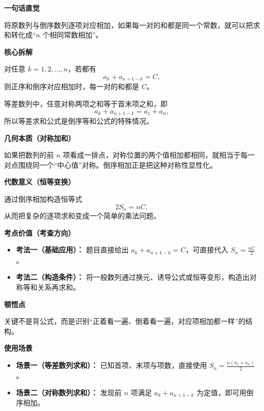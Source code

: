 \begin{explanationbox}
	\textbf{\textcolor{CExplanation}{一句话直觉}}

	将原数列与倒序数列逐项对应相加，如果每一对的和都是同一个常数，就可以把求和转化成“\(n\) 个相同常数相加”。

	\medskip
	\textbf{\textcolor{CExplanation}{核心拆解}}
	\begin{description}[style=nextline, leftmargin=2.8em, labelsep=0.5em, itemsep=0.45em]
		\item[\textbf{要点一（配对思想）：}]
		      对任意 \(k=1,2,\dots,n\)，若都有
		      \[
			      a_k+a_{n+1-k}=C,
		      \]
		      则正序和倒序对应相加时，每一对的和都是 \(C\)。
		\item[\textbf{要点二（等差特例）：}]
		      等差数列中，任意对称两项之和等于首末项之和，即
		      \[
			      a_k+a_{n+1-k}=a_1+a_n,
		      \]
		      所以等差求和公式是倒序等和公式的特殊情况。
	\end{description}

	\medskip
	\textbf{\textcolor{CExplanation}{几何本质（对称加和）}}

	如果把数列的前 \(n\) 项看成一排点，对称位置的两个值相加都相同，就相当于每一对点围绕同一个“中心值”对称。倒序相加正是把这种对称性显性化。

	\medskip
	\textbf{\textcolor{CExplanation}{代数意义（恒等变换）}}

	通过倒序相加构造恒等式
	\[
		2S_n=nC,
	\]
	从而把复杂的逐项求和变成一个简单的乘法问题。

	\medskip
	\textbf{\textcolor{CExplanation}{考点价值（考查方向）}}
	\begin{itemize}[leftmargin=*, itemsep=0.5em, topsep=0.4em]
		\item \textbf{考法一（基础应用）：} 题目直接给出 \(a_k+a_{n+1-k}=C\)，可直接代入 \(S_n=\frac{nC}{2}\)。
		\item \textbf{考法二（构造条件）：} 将一般数列通过换元、诱导公式或恒等变形，构造出对称等和关系再求和。
	\end{itemize}

	\medskip
	\textbf{\textcolor{CExplanation}{顿悟点}}

	关键不是背公式，而是识别“正着看一遍、倒着看一遍，对应项相加都一样”的结构。

	\medskip
	\textbf{\textcolor{CExplanation}{使用场景}}
	\begin{itemize}[leftmargin=*, itemsep=0.5em, topsep=0.4em]
		\item \textbf{场景一（等差数列求和）：} 已知首项、末项与项数，直接使用 \(S_n=\frac{n(a_1+a_n)}{2}\)。
		\item \textbf{场景二（对称数列求和）：} 发现前 \(n\) 项满足 \(a_k+a_{n+1-k}\) 为定值，即可用倒序相加。
	\end{itemize}
\end{explanationbox}